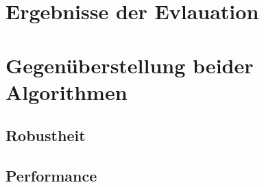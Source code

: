 \section{Ergebnisse der Evlauation}
\label{sec:anforderunsevaluierung}

\section{Gegenüberstellung beider Algorithmen}
\label{sec:gegenueberstellung}

\subsection{Robustheit}
\label{subsec:discussion_robsutness}
	

\subsection{Performance}
\label{subsec:discussion_performance}
  

